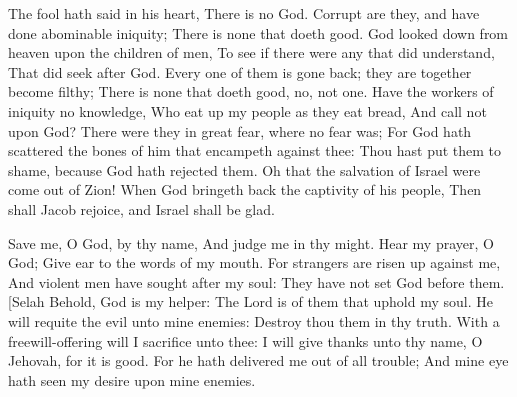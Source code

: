 The fool hath said in his heart, There is no God. Corrupt are they, and have done abominable iniquity; There is none that doeth good.  God looked down from heaven upon the children of men, To see if there were any that did understand, That did seek after God.  Every one of them is gone back; they are together become filthy; There is none that doeth good, no, not one.  Have the workers of iniquity no knowledge, Who eat up my people as they eat bread, And call not upon God?  There were they in great fear, where no fear was; For God hath scattered the bones of him that encampeth against thee: Thou hast put them to shame, because God hath rejected them.  Oh that the salvation of Israel were come out of Zion! When God bringeth back the captivity of his people, Then shall Jacob rejoice, and Israel shall be glad. 

Save me, O God, by thy name, And judge me in thy might.  Hear my prayer, O God; Give ear to the words of my mouth.  For strangers are risen up against me, And violent men have sought after my soul: They have not set God before them. [Selah  Behold, God is my helper: The Lord is of them that uphold my soul.  He will requite the evil unto mine enemies: Destroy thou them in thy truth.  With a freewill-offering will I sacrifice unto thee: I will give thanks unto thy name, O Jehovah, for it is good.  For he hath delivered me out of all trouble; And mine eye hath seen my desire upon mine enemies. 

